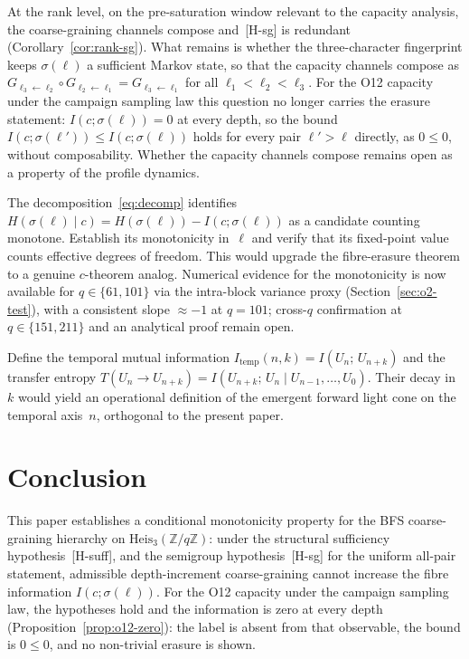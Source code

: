 \documentclass[11pt,a4paper]{article}
\theoremstyle{plain}
\theoremstyle{definition}
\theoremstyle{remark}
\begin{document}
\begin{description}[style=nextline]
\item[\textup{[O-1b]} Fingerprint composability of the capacity channel.]
At the rank level, on the pre-saturation window relevant to the capacity analysis,
the coarse-graining channels compose and~\textup{[H-sg]} is redundant
(Corollary~\ref{cor:rank-sg}).
What remains is whether the three-character fingerprint keeps $\sigma(\ell)$ a sufficient
Markov state, so that the capacity channels compose as
$G_{\ell_3 \leftarrow \ell_2} \circ G_{\ell_2 \leftarrow \ell_1} = G_{\ell_3 \leftarrow \ell_1}$
for all $\ell_1 < \ell_2 < \ell_3$.
For the O12 capacity under the campaign sampling law this question no longer carries the
erasure statement: $I(c;\sigma(\ell)) = 0$ at every depth, so the bound
$I(c;\sigma(\ell')) \leq I(c;\sigma(\ell))$ holds for every pair $\ell' > \ell$ directly, as
$0 \leq 0$, without composability.
Whether the capacity channels compose remains open as a property of the profile dynamics.

\item[\textup{[O-2]} $c$-theorem analog via $H(\sigma(\ell))$.]
The decomposition~\eqref{eq:decomp} identifies
$H(\sigma(\ell) \mid c) = H(\sigma(\ell)) - I(c;\sigma(\ell))$
as a candidate counting monotone.
Establish its monotonicity in~$\ell$ and verify that its fixed-point value
counts effective degrees of freedom.
This would upgrade the fibre-erasure theorem to a genuine $c$-theorem analog.
Numerical evidence for the monotonicity is now available for $q \in \{61, 101\}$
via the intra-block variance proxy (Section~\ref{sec:o2-test}),
with a consistent slope ${\approx}{-1}$ at $q = 101$;
cross-$q$ confirmation at $q \in \{151, 211\}$ and an analytical proof remain open.

\item[\textup{[O-3]} Temporal causal structure and emergent light cone.]
Define the temporal mutual information
$I_{\mathrm{temp}}(n,k) = I(U_n;\,U_{n+k})$
and the transfer entropy
$T(U_n \to U_{n+k}) = I(U_{n+k};\,U_n \mid U_{n-1},\ldots,U_0)$.
Their decay in~$k$ would yield an operational definition of the emergent forward
light cone on the temporal axis~$n$, orthogonal to the present paper.

  \end{description}

  \section{Conclusion}
  \label{sec:conclusion}

  This paper establishes a conditional monotonicity property for the BFS coarse-graining
  hierarchy on $\mathrm{Heis}_3(\mathbb{Z}/q\mathbb{Z})$:
  under the structural sufficiency hypothesis~\textup{[H-suff]}, and the semigroup
  hypothesis~\textup{[H-sg]} for the uniform all-pair statement, admissible depth-increment
  coarse-graining cannot increase the fibre information $I(c;\sigma(\ell))$.
  For the O12 capacity under the campaign sampling law, the hypotheses hold and the
  information is zero at every depth (Proposition~\ref{prop:o12-zero}): the label is absent
  from that observable, the bound is $0 \leq 0$, and no non-trivial erasure is shown.
\end{document}

